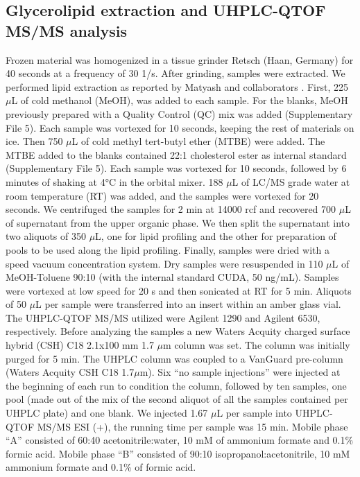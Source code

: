 \documentclass[9pt,twocolumn,twoside]{BioRxiv}
\begin{document}
\subsection{Glycerolipid extraction and UHPLC-QTOF MS/MS analysis} 
Frozen material was homogenized in a tissue grinder Retsch (Haan, Germany) for 40 seconds at a frequency of 30 1/s. After grinding, samples were extracted. 
We performed lipid extraction as reported by Matyash and collaborators \cite{Matyash2008-ue}. 
First, 225 $\mu$L of cold methanol (MeOH), was added to each sample. 
For the blanks, MeOH previously prepared with a Quality Control (QC) mix was added (Supplementary File 5). Each sample was vortexed for 10 seconds, keeping the rest of materials on ice. 
Then 750 $\mu$L of cold methyl tert-butyl ether (MTBE) were added. The MTBE added to the blanks contained 22:1 cholesterol ester as internal standard (Supplementary File 5). 
Each sample was vortexed for 10 seconds, followed by 6 minutes of shaking at 4°C in the orbital mixer. 
188 $\mu$L of LC/MS grade water at room temperature (RT) was added, and the samples were vortexed for 20 seconds.
We centrifuged the samples for 2 min at 14000 rcf and recovered 700 $\mu$L of supernatant from the upper organic phase. 
We then split the supernatant into two aliquots of 350 $\mu$L, one for lipid profiling and the other for preparation of pools to be used along the lipid profiling. 
Finally, samples were dried with a speed vacuum concentration system.
Dry samples were resuspended in 110 $\mu$L of MeOH-Toluene 90:10 (with the internal standard CUDA, 50 ng/mL). 
Samples were vortexed at low speed for 20 s and then sonicated at RT for 5 min. 
Aliquots of 50 $\mu$L per sample were transferred into an insert within an amber glass vial.
The UHPLC-QTOF MS/MS utilized were Agilent 1290 and Agilent 6530, respectively. 
Before analyzing the samples a new Waters Acquity charged surface hybrid (CSH) C18 2.1x100 mm 1.7 $\mu$m column was set. 
The column was initially purged for 5 min. 
The UHPLC column was coupled to a VanGuard pre-column (Waters Acquity CSH C18 1.7$\mu$m). 
Six “no sample injections” were injected at the beginning of each run to condition the column, followed by ten samples, one pool (made out of the mix of the second aliquot of all the samples contained per UHPLC plate) and one blank.
We injected 1.67 $\mu$L per sample into UHPLC-QTOF MS/MS ESI (+), the running time per sample was 15 min. Mobile phase “A” consisted of 60:40 acetonitrile:water, 10 mM of ammonium formate and 0.1\% formic acid. 
Mobile phase “B” consisted of 90:10 isopropanol:acetonitrile, 10 mM ammonium formate and 0.1\% of formic acid. 
\end{document}
